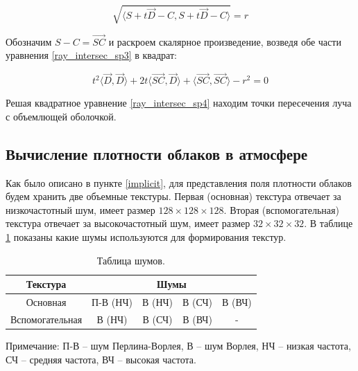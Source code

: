 \begin{equation}
	\label{ray_intersec_sp3}
	\sqrt{\langle S + t \vec{D} - C , S + t \vec{D} - C \rangle} = r
\end{equation}

Обозначим $ S - C = \vec{SC} $ и раскроем скалярное произведение, возведя обе части уравнения \eqref{ray_intersec_sp3} в квадрат:

\begin{equation}
	\label{ray_intersec_sp4}
	t ^ 2 \langle \vec{D}, \vec{D} \rangle + 2t \langle \vec{SC}, \vec{D} \rangle + \langle \vec{SC}, \vec{SC} \rangle - r ^ 2 = 0
\end{equation}

Решая квадратное уравнение \eqref{ray_intersec_sp4} находим точки пересечения луча с объемлющей оболочкой.

\subsection{Вычисление плотности облаков в атмосфере}

Как было описано в пункте \ref{implicit}, для представления поля плотности облаков будем хранить две объемные текстуры.
Первая (основная) текстура отвечает за низкочастотный шум, имеет размер $ 128 \times 128 \times 128 $. Вторая (вспомогательная) текстура отвечает за высокочастотный шум, имеет размер $ 32 \times 32 \times 32 $. 
В таблице \ref{tab:textures} показаны какие шумы используются для формирования текстур.


\begin{table}[h]
	\centering
	\begin{threeparttable}
		\captionsetup{justification=raggedleft,singlelinecheck=false}
		\caption{Таблица шумов.}      
		\begin{tabular}{|c|c|c|c|c|}
			\hline
			Текстура & \multicolumn{4}{c|}{Шумы} \\
			\hline
			Основная & П-В (НЧ) & В (НЧ) & В (СЧ) & В (ВЧ)\\
			\hline
			Вспомогательная & В (НЧ) & В (СЧ) & В (ВЧ) & -\\
			\hline
		\end{tabular}
		\begin{tablenotes}
			\small
			\item Примечание: П-В -- шум Перлина-Ворлея, В -- шум Ворлея, НЧ -- низкая частота, СЧ -- средняя частота, ВЧ -- высокая частота.
		\end{tablenotes}
		\label{tab:textures}
	\end{threeparttable} 
	 

\end{table}



